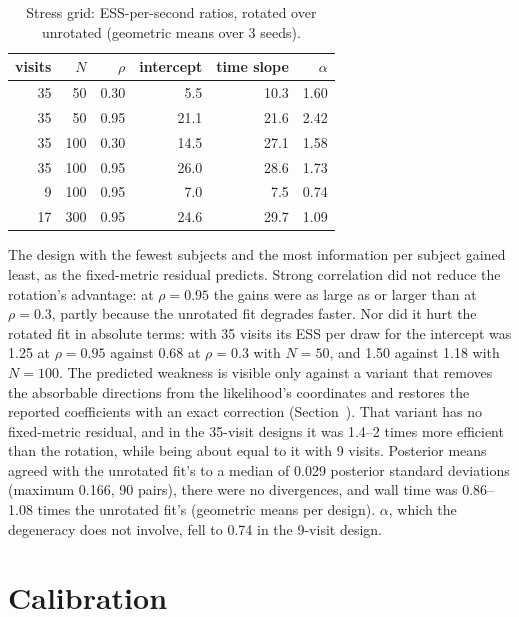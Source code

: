 \begin{table}[ht]
\centering
\caption{Stress grid: ESS-per-second ratios, rotated over unrotated
(geometric means over 3 seeds).}
\label{tab:stress}
\small
\begin{tabular}{rrr rrr}
\toprule
visits & $N$ & $\rho$ & intercept & time slope & $\alpha$ \\
\midrule
35 &  50 & 0.30 &  5.5 & 10.3 & 1.60 \\
35 &  50 & 0.95 & 21.1 & 21.6 & 2.42 \\
35 & 100 & 0.30 & 14.5 & 27.1 & 1.58 \\
35 & 100 & 0.95 & 26.0 & 28.6 & 1.73 \\
 9 & 100 & 0.95 &  7.0 &  7.5 & 0.74 \\
17 & 300 & 0.95 & 24.6 & 29.7 & 1.09 \\
\bottomrule
\end{tabular}
\end{table}

The design with the fewest subjects and the most information per subject
gained least, as the fixed-metric residual predicts. Strong correlation
did not reduce the rotation's advantage: at $\rho = 0.95$ the gains were
as large as or larger than at $\rho = 0.3$, partly because the unrotated
fit degrades faster. Nor did it hurt the rotated fit in absolute terms:
with 35 visits its ESS per draw for the intercept was 1.25 at $\rho = 0.95$
against 0.68 at $\rho = 0.3$ with $N = 50$, and 1.50 against 1.18 with $N
= 100$. The predicted weakness is visible only against a variant that
removes the absorbable directions from the likelihood's coordinates and
restores the reported coefficients with an exact correction
(Section~). That variant has no fixed-metric residual,
and in the 35-visit designs it was 1.4--2 times more efficient than the
rotation, while being about equal to it with 9 visits. Posterior means
agreed with the unrotated fit's to a median of 0.029 posterior standard
deviations (maximum 0.166, 90 pairs), there were no divergences, and wall
time was 0.86--1.08 times the unrotated fit's (geometric means per
design). $\alpha$, which the degeneracy does not involve, fell to 0.74 in
the 9-visit design.

\section{Calibration}\label{sec:calib}

